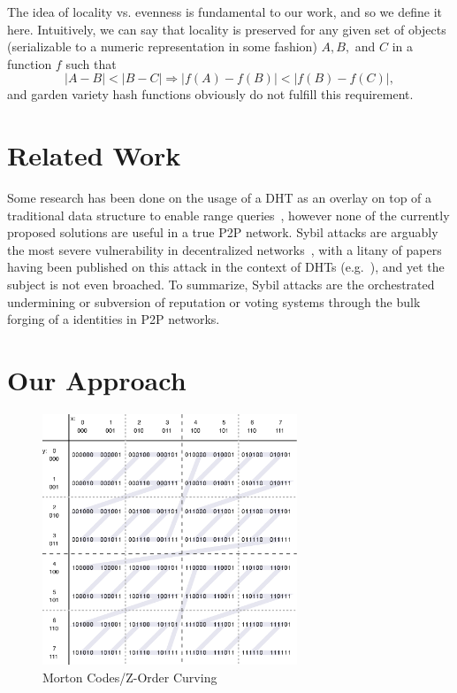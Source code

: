 \documentclass[10pt]{IEEEtran}
\begin{document}
The idea of locality vs. evenness is fundamental to our work, and so we define it here. Intuitively, we can say that locality is preserved for any given set of objects (serializable to a numeric representation in some fashion) $A,B,$ and $C$ in a function $f$ such that
\begin{equation} \label{eq:locality}
|A-B| < |B-C| \Rightarrow |f(A)-f(B)| < |f(B) - f(C)|,
\end{equation}
and garden variety hash functions obviously do not fulfill this requirement.

\section{Related Work}
\par Some research has been done on the usage of a DHT as an overlay on top of a traditional data structure to enable range queries~\cite{Ramabhadran:2004tr,Desnoyers:2008uo,forestiero2009self}, however none of the currently proposed solutions are useful in a true P2P network. Sybil attacks are arguably the most severe vulnerability in decentralized networks~\cite{Douceur:2002jr}, with a litany of papers having been published on this attack in the context of DHTs (e.g.~\cite{LesniewskiLass:2010ue}), and yet the subject is not even broached. To summarize, Sybil attacks are the orchestrated undermining or subversion of reputation or voting systems through the bulk forging of a identities in P2P networks.



\section{Our Approach}
\begin{figure}[!t]
\centering
\includegraphics[width=3in]{ZCurve}
\caption{Morton Codes/Z-Order Curving~\cite{ZorderCurve:2015vo}}
\label{fig_MCode}
\end{figure}
\end{document}
